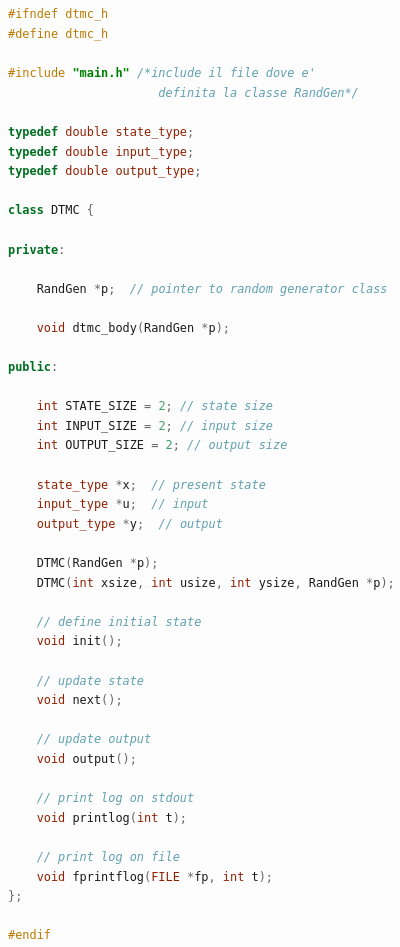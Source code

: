 \documentclass[10pt, letterpaper]{report}
\begin{document}
\subsection{}
\begin{lstlisting}[style=CppStyle,language=C++]
#ifndef dtmc_h
#define dtmc_h
    
#include "main.h" /*include il file dove e'
                     definita la classe RandGen*/
    
typedef double state_type;
typedef double input_type;
typedef double output_type;
    
class DTMC {
    
private:
    
    RandGen *p;  // pointer to random generator class
      
    void dtmc_body(RandGen *p);
    
public:
    
    int STATE_SIZE = 2; // state size
    int INPUT_SIZE = 2; // input size
    int OUTPUT_SIZE = 2; // output size
    
    state_type *x;  // present state
    input_type *u;  // input
    output_type *y;  // output
    
    DTMC(RandGen *p);
    DTMC(int xsize, int usize, int ysize, RandGen *p);
    
    // define initial state
    void init();
    
    // update state
    void next();
      
    // update output
    void output();
    
    // print log on stdout
    void printlog(int t);
    
    // print log on file
    void fprintflog(FILE *fp, int t);
};
    
#endif
\end{lstlisting}
\end{document}
